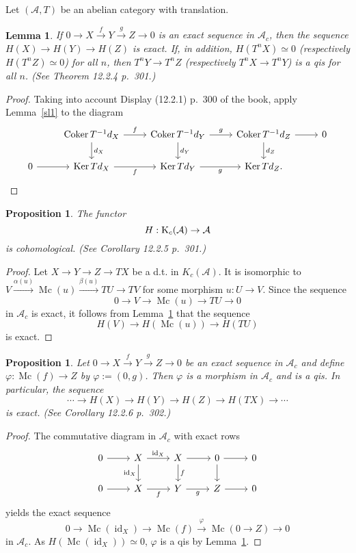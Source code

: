 \documentclass[12pt]{article}
\newtheorem{lem}[thm]{Lemma}
\newtheorem{prop}[thm]{Proposition}
\theoremstyle{remark}
\theoremstyle{definition}
\newcommand{\A}{\mathcal A}
\newcommand{\xr}{\xrightarrow}
\DeclareMathOperator{\Coker}{Coker}
\DeclareMathOperator{\id}{id}
\DeclareMathOperator{\Ker}{Ker}
\DeclareMathOperator{\Mc}{Mc}
\begin{document}
Let $(\A,T)$ be an abelian category with translation. 
%
\begin{lem}\label{sl2}
If $0\to X\xr fY\xr g Z\to0$ is an exact sequence in $\A_c$, then the sequence $H(X)\to H(Y)\to H(Z)$ is exact. If, in addition, $H(T^nX)\simeq0$ (respectively $H(T^nZ)\simeq0$) for all $n$, then $T^nY\to T^nZ$ (respectively $T^nX\to T^nY$) is a qis for all $n$. (See Theorem 12.2.4 p.~301.)
\end{lem}
%
\begin{proof}
Taking into account Display (12.2.1) p.~300 of the book, apply Lemma~\ref{sl1} to the diagram 
$$
\begin{tikzcd}
{}&\Coker T^{-1}d_X\ar{d}{d_X}\ar{r}{f}&\Coker T^{-1}d_Y\ar{d}{d_Y}\ar{r}{g}&\Coker T^{-1}d_Z\ar{d}{d_Z}\ar{r}&0\\ 
0\ar{r}&\Ker Td_X\ar{r}[swap]{f}&\Ker Td_Y\ar{r}[swap]{g}&\Ker Td_Z.
\end{tikzcd}
$$ 
\end{proof}
%
\begin{prop}\label{sl3}
The functor 
$$
H:\text K_c(\A)\to\A
$$ 
is cohomological. (See Corollary 12.2.5 p.~301.) 
\end{prop}
%
\begin{proof}
Let $X\to Y\to Z\to TX$ be a d.t. in $K_c(\A)$. It is isomorphic to $V\xr{\alpha(u)}\Mc(u)\xr{\beta(u)}TU\to TV$ for some morphism $u:U\to V$. Since the sequence 
$$
0\to V\to\Mc(u)\to TU\to0
$$ 
in $\A_c$ is exact, it follows from Lemma~\ref{sl2} that the sequence 
$$ 
H(V)\to H(\Mc(u))\to H(TU)
$$ 
is exact.
\end{proof}
%
\begin{prop}\label{sl4}
Let $0\to X\xr f Y\xr g Z\to0$ be an exact sequence in $\A_c$ and define $\varphi:\Mc(f)\to Z$ by $\varphi:=(0,g)$. Then $\varphi$ is a morphism in $\A_c$ and is a qis. In particular, the sequence 
$$
\cdots\to H(X)\to H(Y)\to H(Z)\to H(TX)\to\cdots
$$
is exact. (See Corollary 12.2.6 p.~302.)
\end{prop}
%
\begin{proof}
The commutative diagram in $\A_c$ with exact rows 
$$
\begin{tikzcd}
0\ar{r}&X\ar{d}[swap]{\id_X}\ar{r}{\id_X}&X\ar{d}{f}\ar{r}&0\ar{d}\ar{r}&0\\ 
0\ar{r}&X\ar{r}[swap]{f}&Y\ar{r}[swap]{g}&Z\ar{r}&0
\end{tikzcd}
$$ 
yields the exact sequence 
$$
0\to\Mc(\id_X)\to\Mc(f)\xr\varphi\Mc(0\to Z)\to0
$$
in $\A_c$. As $H(\Mc(\id_X))\simeq0$, $\varphi$ is a qis by Lemma~\ref{sl2}.
\end{proof}
%
%
\end{document}
